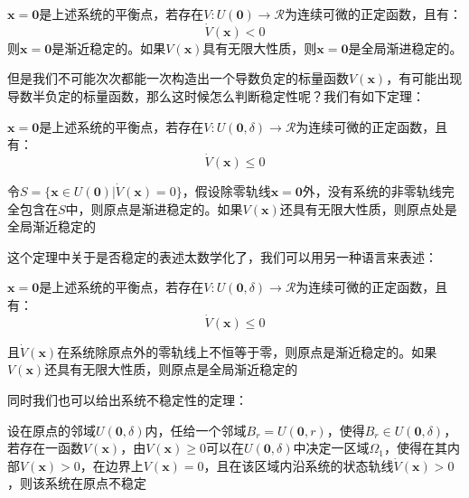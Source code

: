 \begin{theorem}
    $\bm{x} = \bm{0}$是上述系统的平衡点，若存在$V:U(\bm{0}) \rightarrow \mathcal{R}$为连续可微的正定函数，且有：
    \begin{equation*}
        \dot{V}(\bm{x}) < 0
    \end{equation*}
    则$\bm{x} = \bm{0}$是渐近稳定的。如果$V(\bm{x})$具有无限大性质，则$\bm{x} = \bm{0}$是全局渐进稳定的。
\end{theorem}

但是我们不可能次次都能一次构造出一个导数负定的标量函数$V(\bm{x})$，有可能出现导数半负定的标量函数，那么这时候怎么判断稳定性呢？我们有如下定理：

\begin{theorem}[Krasovskii定理]
    $\bm{x} = \bm{0}$是上述系统的平衡点，若存在$V:U(\bm{0},\delta) \rightarrow \mathcal{R}$为连续可微的正定函数，且有：
    \begin{equation*}
        \dot{V}(\bm{x}) \leq  0
    \end{equation*}

    令$S = \{\bm{x}\in U(\bm{0}) | \dot{V}(\bm{x}) = 0 \}$，假设除零轨线$\bm{x} = \bm{0}$外，没有系统的非零轨线完全包含在$S$中，则原点是渐进稳定的。如果$V(\bm{x})$还具有无限大性质，则原点处是全局渐近稳定的
\end{theorem}

这个定理中关于是否稳定的表述太数学化了，我们可以用另一种语言来表述：
\begin{theorem}[Krasovskii定理的等效表述]
    $\bm{x} = \bm{0}$是上述系统的平衡点，若存在$V:U(\bm{0},\delta) \rightarrow \mathcal{R}$为连续可微的正定函数，且有：
    \begin{equation*}
        \dot{V}(\bm{x}) \leq  0
    \end{equation*}

    且$\dot{V}(\bm{x})$在系统除原点外的零轨线上不恒等于零，则原点是渐近稳定的。如果$V(\bm{x})$还具有无限大性质，则原点是全局渐近稳定的
\end{theorem}

同时我们也可以给出系统不稳定性的定理：
\begin{theorem}[不稳定性定理]
    设在原点的邻域$U(\bm{0},\delta)$内，任给一个邻域$B_r = U(\bm{0},r)$，使得$B_r \in U(\bm{0},\delta)$，若存在一函数$V(\bm{x})$，由$V(\bm{x}) \geq 0 $可以在$U(\bm{0},\delta)$中决定一区域$\Omega_1$，使得在其内部$V(\bm{x})>0$，在边界上$V(\bm{x}) = 0$，且在该区域内沿系统的状态轨线$\dot{V}(\bm{x}) >0$，则该系统在原点不稳定
\end{theorem}

